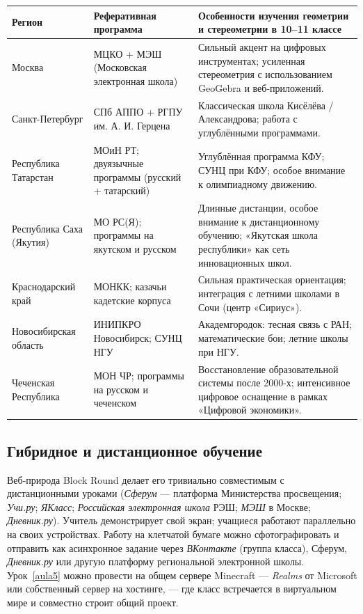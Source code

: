 \documentclass[12pt,a4paper]{scrartcl}
\begin{document}
\begin{center}
\small
\begin{tabularx}{\textwidth}{@{}p{}p{}X@{}}
\toprule
\textbf{Регион} & \textbf{Реферативная программа} & \textbf{Особенности изучения геометрии и стереометрии в 10--11 классе} \\
\midrule
Москва & МЦКО + МЭШ (Московская электронная школа) & Сильный акцент на цифровых инструментах; усиленная стереометрия с использованием GeoGebra и веб-приложений. \\
\addlinespace[3pt]
Санкт-Петербург & СПб АППО + РГПУ им. А. И. Герцена & Классическая школа Кисёлёва / Александрова; работа с углублёнными программами. \\
\addlinespace[3pt]
Республика Татарстан & МОиН РТ; двуязычные программы (русский + татарский) & Углублённая программа КФУ; СУНЦ при КФУ; особое внимание к олимпиадному движению. \\
\addlinespace[3pt]
Республика Саха (Якутия) & МО РС(Я); программы на якутском и русском & Длинные дистанции, особое внимание к дистанционному обучению; «Якутская школа республики» как сеть инновационных школ. \\
\addlinespace[3pt]
Краснодарский край & МОНКК; казачьи кадетские корпуса & Сильная практическая ориентация; интеграция с летними школами в Сочи (центр «Сириус»). \\
\addlinespace[3pt]
Новосибирская область & ИНИПКРО Новосибирск; СУНЦ НГУ & Академгородок: тесная связь с РАН; математические бои; летние школы при НГУ. \\
\addlinespace[3pt]
Чеченская Республика & МОН ЧР; программы на русском и чеченском & Восстановление образовательной системы после 2000-х; интенсивное цифровое оснащение в рамках «Цифровой экономики». \\
\bottomrule
\end{tabularx}
\end{center}

\subsection{Гибридное и дистанционное обучение}
Веб-природа Block Round делает его тривиально совместимым с дистанционными уроками (\emph{Сферум} --- платформа Министерства просвещения; \emph{Учи.ру}; \emph{ЯКласс}; \emph{Российская электронная школа} РЭШ; \emph{МЭШ} в Москве; \emph{Дневник.ру}). Учитель демонстрирует свой экран; учащиеся работают параллельно на своих устройствах. Работу на клетчатой бумаге можно сфотографировать и отправить как асинхронное задание через \emph{ВКонтакте} (группа класса), Сферум, \emph{Дневник.ру} или другую платформу региональной электронной школы. Урок~\ref{aula5} можно провести на общем сервере Minecraft --- \emph{Realms} от Microsoft или собственный сервер на хостинге, --- где класс встречается в виртуальном мире и совместно строит общий проект.
\end{document}

